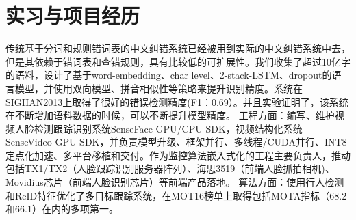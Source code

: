 \documentclass[11pt,a4paper]{moderncv}
\begin{document}
\section{实习与项目经历}
{传统基于分词和规则错词表的中文纠错系统已经被用到实际的中文纠错系统中去，但是其依赖于错词表和查错规则，具有比较低的可扩展性。我们收集了超过10亿字的语料，设计了基于word-embedding、char level、2-stack-LSTM、dropout的语言模型，并使用双向模型、拼音相似性等策略来提升识别精度。系统在SIGHAN2013上取得了很好的错误检测精度(F1：0.69）。并且实验证明了，该系统在不断增加语料数据的时候，可以不断提升模型精度。 }
{工程方面：编写、维护视频人脸检测跟踪识别系统SenseFace-GPU/CPU-SDK，视频结构化系统SenseVideo-GPU-SDK，并负责模型升级、框架并行、多线程/CUDA并行、INT8定点化加速、多平台移植和交付。作为监控算法嵌入式化的工程主要负责人，推动包括TX1/TX2（人脸跟踪识别服务器阵列）、海思3519（前端人脸抓拍相机)、Movidius芯片（前端人脸识别芯片）等前端产品落地。
算法方面：使用行人检测和ReID特征优化了多目标跟踪系统，在MOT16榜单上取得包括MOTA指标（68.2和66.1）在内的多项第一。
}
\end{document}
